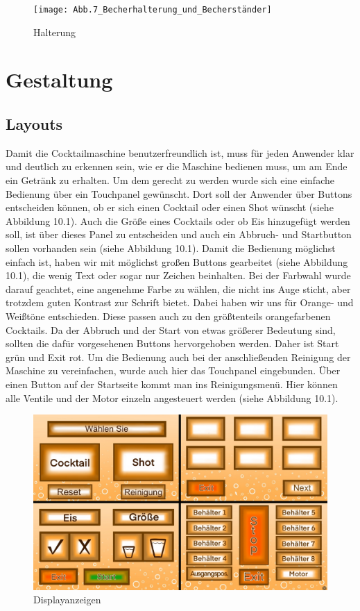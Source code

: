 \documentclass[10pt,a4paper]{report}
\begin{document}
	\begin{figure}[htb]
		\texttt{[image: Abb.7\_Becherhalterung\_und\_Becherständer]}
		\centering
		\caption{Halterung}
	\end{figure}
	
	\chapter{Gestaltung}
	
	\section{Layouts}
	Damit die Cocktailmaschine benutzerfreundlich ist, muss für jeden Anwender klar und deutlich zu erkennen sein, wie er die Maschine bedienen muss, um am Ende ein Getränk zu erhalten. Um dem gerecht zu werden wurde sich eine einfache Bedienung über ein Touchpanel gewünscht. Dort soll der Anwender über Buttons entscheiden können, ob er sich einen Cocktail oder einen Shot wünscht (siehe Abbildung 10.1). Auch die Größe eines Cocktails oder ob Eis hinzugefügt werden soll, ist über dieses Panel zu entscheiden und auch ein Abbruch- und Startbutton sollen vorhanden sein (siehe Abbildung 10.1). 
	Damit die Bedienung möglichst einfach ist, haben wir mit möglichst großen Buttons gearbeitet (siehe Abbildung 10.1), die wenig Text oder sogar nur Zeichen beinhalten. Bei der Farbwahl wurde darauf geachtet, eine angenehme Farbe zu wählen, die nicht ins Auge sticht, aber trotzdem guten Kontrast zur Schrift bietet. Dabei haben wir uns für Orange- und Weißtöne entschieden. Diese passen auch zu den größtenteils orangefarbenen Cocktails. Da der Abbruch und der Start von etwas größerer Bedeutung sind, sollten die dafür vorgesehenen Buttons hervorgehoben werden. Daher ist Start grün und Exit rot. Um die Bedienung auch bei der anschließenden Reinigung der Maschine zu vereinfachen, wurde auch hier das Touchpanel eingebunden. Über einen Button auf der Startseite kommt man ins Reinigungsmenü. Hier können alle Ventile und der Motor einzeln angesteuert werden (siehe Abbildung 10.1).
	
	\begin{figure}[htb]
		\includegraphics[width=1\textwidth]{Abb.A_Bildschirmpanels}
		\centering
		\caption{Displayanzeigen}
	\end{figure}
	\newpage
\end{document}
